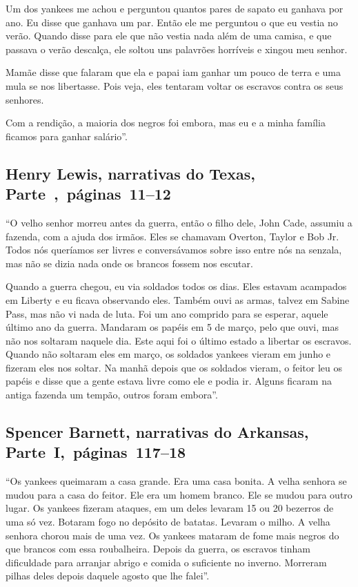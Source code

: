 Um dos yankees me achou e perguntou quantos pares de sapato eu ganhava
por ano. Eu disse que ganhava um par. Então ele me perguntou o que eu
vestia no verão. Quando disse para ele que não vestia nada além de uma
camisa, e que passava o verão descalça, ele soltou uns palavrões
horríveis e xingou meu senhor.

Mamãe disse que falaram que ela e papai iam ganhar um pouco de terra e
uma mula se nos libertasse. Pois veja, eles tentaram voltar os escravos
contra os seus senhores.

Com a rendição, a maioria dos negros foi embora, mas eu e a minha
família ficamos para ganhar salário''.

\subsection{Henry Lewis, narrativas do Texas, Parte~,~páginas~11--12}
\label{ref177}

``O velho senhor morreu antes da guerra, então o filho dele, John Cade,
assumiu a fazenda, com a ajuda dos irmãos. Eles se chamavam Overton,
Taylor e Bob Jr. Todos nós queríamos ser livres e conversávamos sobre
isso entre nós na senzala, mas não se dizia nada onde os brancos fossem
nos escutar.

Quando a guerra chegou, eu via soldados todos os dias. Eles estavam
acampados em Liberty e eu ficava observando eles. Também ouvi as armas,
talvez em Sabine Pass, mas não vi nada de luta. Foi um ano comprido para
se esperar, aquele último ano da guerra. Mandaram os papéis em 5 de
março, pelo que ouvi, mas não nos soltaram naquele dia. Este aqui foi o
último estado a libertar os escravos. Quando não soltaram eles em março,
os soldados yankees vieram em junho e fizeram eles nos soltar. Na manhã
depois que os soldados vieram, o feitor leu os papéis e disse que a
gente estava livre como ele e podia ir. Alguns ficaram na antiga fazenda
um tempão, outros foram embora''.

\subsection{Spencer Barnett, narrativas do Arkansas, Parte~I,~páginas~117--18} \label{ref19}

``Os yankees queimaram a casa grande. Era uma casa bonita. A velha
senhora se mudou para a casa do feitor. Ele era um homem branco. Ele se
mudou para outro lugar. Os yankees fizeram ataques, em um deles levaram
15 ou 20 bezerros de uma só vez. Botaram fogo no depósito de batatas.
Levaram o milho. A velha senhora chorou mais de uma vez. Os yankees
mataram de fome mais negros do que brancos com essa roubalheira. Depois
da guerra, os escravos tinham dificuldade para arranjar abrigo e comida
o suficiente no inverno. Morreram pilhas deles depois daquele agosto que
lhe falei''.

